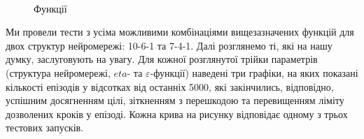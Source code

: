 \documentclass[a4paper,10pt,fleqn]{article}
\begin{document}
\begin{figure}[h]
  \centering
  \,\,\,
  \caption{Функції}
\end{figure}

Ми провели тести з усіма можливими комбінаціями вищезазначених функцій для двох структур нейромережі: 10-6-1 та 7-4-1. Далі розглянемо ті, які на нашу думку, заслуговують на увагу. Для кожної розглянутої трійки параметрів (структура нейромережі, $eta$- та $\varepsilon$-функції) наведені три графіки, на яких показані кількості епізодів у відсотках від останніх 5000, які закінчились, відповідно, успішним досягненням цілі, зіткненням з перешкодою та перевищенням ліміту дозволених кроків у епізоді. Кожна крива на рисунку відповідає одному з трьох тестових запусків.
\end{document}
